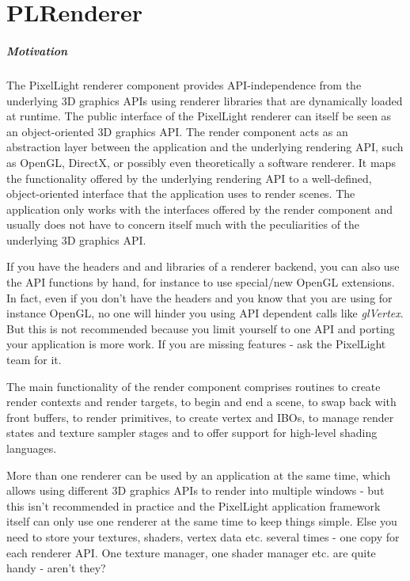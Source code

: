 \chapter{PLRenderer}


\paragraph{Motivation}
The PixelLight renderer component provides \ac{API}-independence from the underlying 3D graphics \ac{API}s using renderer libraries that are dynamically loaded at runtime. The public interface of the PixelLight renderer can itself be seen as an object-oriented 3D graphics \ac{API}. The render component acts as an abstraction layer between the application and the underlying rendering \ac{API}, such as \ac{OpenGL}, DirectX, or possibly even theoretically a software renderer. It maps the functionality offered by the underlying rendering \ac{API} to a well-defined, object-oriented interface that the application uses to render scenes. The application only works with the interfaces offered by the render component and usually does not have to concern itself much with the peculiarities of the underlying 3D graphics \ac{API}.

If you have the headers and and libraries of a renderer backend, you can also use the \ac{API} functions by hand, for instance to use special/new \ac{OpenGL} extensions. In fact, even if you don't have the headers and you know that you are using for instance \ac{OpenGL}, no one will hinder you using \ac{API} dependent calls like \emph{glVertex}. But this is not recommended because you limit yourself to one \ac{API} and porting your application is more work. If you are missing features - ask the PixelLight team for it.

The main functionality of the render component comprises routines to create render contexts and render targets, to begin and end a scene, to swap back with front buffers, to render primitives, to create vertex and \ac{IBO}s, to manage render states and texture sampler stages and to offer support for high-level shading languages.

More than one renderer can be used by an application at the same time, which allows using different 3D graphics \ac{API}s to render into multiple windows - but this isn't recommended in practice and the PixelLight application framework itself can only use one renderer at the same time to keep things simple. Else you need to store your textures, shaders, vertex data etc. several times - one copy for each renderer \ac{API}. One texture manager, one shader manager etc. are quite handy - aren't they?

